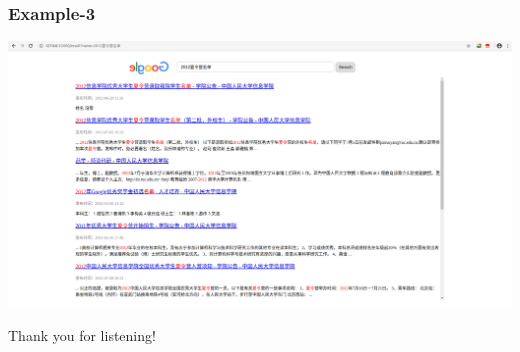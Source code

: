 \documentclass{beamer}
\begin{document}
\begin{frame}
\frametitle{Example-3}
\begin{center}
	\includegraphics[width=1\textwidth, height=0.6\textheight]{example3.png}
\end{center}
\end{frame}

\begin{frame}
	\Large
	\centering
	Thank you for listening!
\end{frame}
\end{document}
